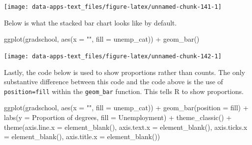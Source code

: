 \documentclass[
]{book}
\makeatletter
\newenvironment{Shaded}{\begin{snugshade}}{\end{snugshade}}
\newcommand{\AttributeTok}[1]{\textcolor[rgb]{0.61,0.61,0.61}{#1}}
\newcommand{\FunctionTok}[1]{\textcolor[rgb]{0,0,0}{#1}}
\newcommand{\NormalTok}[1]{#1}
\newcommand{\SpecialCharTok}[1]{\textcolor[rgb]{0,0,0}{#1}}
\newcommand{\StringTok}[1]{\textcolor[rgb]{0.5,0.5,0.5}{#1}}
\newenvironment{kframe}{%
\medskip{}
\setlength{\fboxsep}{.8em}
 \def\at@end@of@kframe{}%
 \ifinner\ifhmode%
  \def\at@end@of@kframe{\end{minipage}}%
  \begin{minipage}{\columnwidth}%
 \fi\fi%
 \def\FrameCommand##1{\hskip\@totalleftmargin \hskip-\fboxsep
 \colorbox{shadecolor}{##1}\hskip-\fboxsep
     \hskip-\linewidth \hskip-\@totalleftmargin \hskip\columnwidth}%
 \MakeFramed {\advance\hsize-\width
   \@totalleftmargin\z@ \linewidth\hsize
   \@setminipage}}%
 {\par\unskip\endMakeFramed%
 \at@end@of@kframe}
\renewenvironment{Shaded}{\begin{kframe}}{\end{kframe}}
\makeatother
\begin{document}
\begin{center}\texttt{[image: data-apps-text\_files/figure-latex/unnamed-chunk-141-1]} \end{center}

Below is what the stacked bar chart looks like by default.

\begin{Shaded}
\begin{Highlighting}[]
\FunctionTok{ggplot}\NormalTok{(gradschool, }\FunctionTok{aes}\NormalTok{(}\AttributeTok{x =} \StringTok{""}\NormalTok{, }\AttributeTok{fill =}\NormalTok{ unemp\_cat)) }\SpecialCharTok{+}
  \FunctionTok{geom\_bar}\NormalTok{()}
\end{Highlighting}
\end{Shaded}

\begin{center}\texttt{[image: data-apps-text\_files/figure-latex/unnamed-chunk-142-1]} \end{center}

Lastly, the code below is used to show proportions rather than counts. The only substantive difference between this code and the code above is the use of \texttt{position=\textquotesingle{}fill\textquotesingle{}} within the \texttt{geom\_bar} function. This tells R to show proportions.

\begin{Shaded}
\begin{Highlighting}[]
\FunctionTok{ggplot}\NormalTok{(gradschool, }\FunctionTok{aes}\NormalTok{(}\AttributeTok{x =} \StringTok{""}\NormalTok{, }\AttributeTok{fill =}\NormalTok{ unemp\_cat)) }\SpecialCharTok{+}
  \FunctionTok{geom\_bar}\NormalTok{(}\AttributeTok{position =} \StringTok{\textquotesingle{}fill\textquotesingle{}}\NormalTok{) }\SpecialCharTok{+}
  \FunctionTok{labs}\NormalTok{(}\AttributeTok{y =} \StringTok{\textquotesingle{}Proportion of degrees\textquotesingle{}}\NormalTok{,}
       \AttributeTok{fill =} \StringTok{\textquotesingle{}Unemployment\textquotesingle{}}\NormalTok{) }\SpecialCharTok{+}
  \FunctionTok{theme\_classic}\NormalTok{() }\SpecialCharTok{+}
  \FunctionTok{theme}\NormalTok{(}\AttributeTok{axis.line.x =} \FunctionTok{element\_blank}\NormalTok{(),}
        \AttributeTok{axis.text.x =} \FunctionTok{element\_blank}\NormalTok{(),}
        \AttributeTok{axis.ticks.x =} \FunctionTok{element\_blank}\NormalTok{(),}
        \AttributeTok{axis.title.x =} \FunctionTok{element\_blank}\NormalTok{())}
\end{Highlighting}
\end{Shaded}
\end{document}
